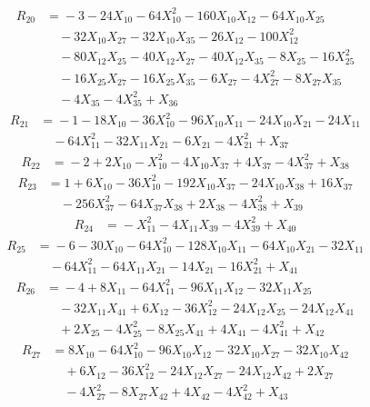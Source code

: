 \[\begin{aligned}
R_{20} &={}-3 - 24X_{10} - 64X_{10}^{2} - 160X_{10}X_{12} - 64X_{10}X_{25}\\
&\quad{} - 32X_{10}X_{27} - 32X_{10}X_{35} - 26X_{12} - 100X_{12}^{2}\\
&\quad{} - 80X_{12}X_{25} - 40X_{12}X_{27} - 40X_{12}X_{35} - 8X_{25} - 16X_{25}^{2}\\
&\quad{} - 16X_{25}X_{27} - 16X_{25}X_{35} - 6X_{27} - 4X_{27}^{2} - 8X_{27}X_{35}\\
&\quad{} - 4X_{35} - 4X_{35}^{2} + X_{36}
\end{aligned}\]
\[\begin{aligned}
R_{21} &={}-1 - 18X_{10} - 36X_{10}^{2} - 96X_{10}X_{11} - 24X_{10}X_{21} - 24X_{11}\\
&\quad{} - 64X_{11}^{2} - 32X_{11}X_{21} - 6X_{21} - 4X_{21}^{2} + X_{37}
\end{aligned}\]
\[\begin{aligned}
R_{22} &={}-2 + 2X_{10} - X_{10}^{2} - 4X_{10}X_{37} + 4X_{37} - 4X_{37}^{2} + X_{38}
\end{aligned}\]
\[\begin{aligned}
R_{23} &={}1 + 6X_{10} - 36X_{10}^{2} - 192X_{10}X_{37} - 24X_{10}X_{38} + 16X_{37}\\
&\quad{} - 256X_{37}^{2} - 64X_{37}X_{38} + 2X_{38} - 4X_{38}^{2} + X_{39}
\end{aligned}\]
\[\begin{aligned}
R_{24} &={}-X_{11}^{2} - 4X_{11}X_{39} - 4X_{39}^{2} + X_{40}
\end{aligned}\]
\[\begin{aligned}
R_{25} &={}-6 - 30X_{10} - 64X_{10}^{2} - 128X_{10}X_{11} - 64X_{10}X_{21} - 32X_{11}\\
&\quad{} - 64X_{11}^{2} - 64X_{11}X_{21} - 14X_{21} - 16X_{21}^{2} + X_{41}
\end{aligned}\]
\[\begin{aligned}
R_{26} &={}-4 + 8X_{11} - 64X_{11}^{2} - 96X_{11}X_{12} - 32X_{11}X_{25}\\
&\quad{} - 32X_{11}X_{41} + 6X_{12} - 36X_{12}^{2} - 24X_{12}X_{25} - 24X_{12}X_{41}\\
&\quad{} + 2X_{25} - 4X_{25}^{2} - 8X_{25}X_{41} + 4X_{41} - 4X_{41}^{2} + X_{42}
\end{aligned}\]
\[\begin{aligned}
R_{27} &={}8X_{10} - 64X_{10}^{2} - 96X_{10}X_{12} - 32X_{10}X_{27} - 32X_{10}X_{42}\\
&\quad{} + 6X_{12} - 36X_{12}^{2} - 24X_{12}X_{27} - 24X_{12}X_{42} + 2X_{27}\\
&\quad{} - 4X_{27}^{2} - 8X_{27}X_{42} + 4X_{42} - 4X_{42}^{2} + X_{43}
\end{aligned}\]
